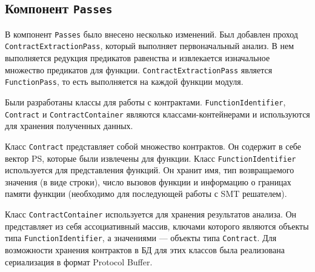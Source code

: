 \subsection{Компонент \texttt{Passes}}
В компонент \texttt{Passes} было внесено несколько изменений. Был добавлен проход \texttt{ContractExtractionPass}, который выполняет первоначальный анализ. В нем выполняется редукция предикатов равенства и извлекается изначальное множество предикатов для функции. \texttt{ContractExtractionPass} является \texttt{FunctionPass}, то есть выполняется на каждой функции модуля.

Были разработаны классы для работы с контрактами. \texttt{FunctionIdentifier}, \texttt{Contract} и \texttt{ContractContainer} являются классами-контейнерами и используются для хранения полученных данных. 

Класс \texttt{Contract} представляет собой множество контрактов. Он содержит в себе вектор PS, которые были извлечены для функции. Класс \texttt{FunctionIdentifier} используется для представления функций. Он хранит имя,  тип возвращаемого значения (в виде строки), число вызовов функции и информацию о границах памяти функции (необходимо для последующей работы с SMT решателем). 

Класс \texttt{ContractContainer} используется для хранения результатов анализа. Он представляет из себя ассоциативный массив, ключами которого являются объекты типа \texttt{FunctionIdentifier}, а значениями --- объекты типа \texttt{Contract}. Для возможности хранения контрактов в БД для этих классов была реализована сериализация в формат Protocol Buffer\cite{protobuf}. 

